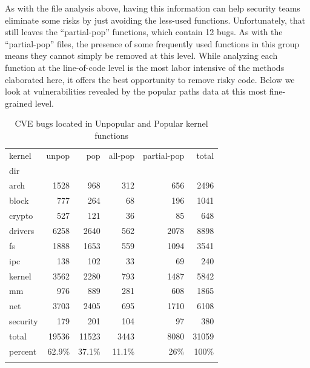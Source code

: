 As with the file analysis above, having this information can help security teams eliminate some risks by just avoiding the less-used functions. 
Unfortunately, that still leaves the ``partial-pop'' functions, which  contain 12 bugs.  As with the ``partial-pop'' files, 
the presence of some frequently used functions in this group means they cannot  simply be removed at this level. 
While analyzing each function at the line-of-code level is the most labor intensive of the methods elaborated here, it offers the best opportunity to remove risky code. 
Below we look at vulnerabilities revealed by the popular paths data at this most fine-grained level. 

\begin{table}
\small
\caption{CVE bugs located in Unpopular and Popular kernel functions}
\label{tab:cve_functions}
\begin{tabular}{l|r|r|r|r|r}
 kernel & unpop & pop & all-pop & partial-pop & total \\
 dir & \color{red}{(CVEs)} & \color{red}{(CVEs)} & \color{red}{(CVEs)} & \color{red}{(CVEs)} & \\
 \hline
 arch & 1528\color{red}{(7)} & 968\color{red}{(1)} & 312 & 656\color{red}{(1)} & 2496 \\
 \hline
 block & 777 & 264 & 68 & 196 & 1041 \\
 \hline
 crypto & 527\color{red}{(6)} & 121 & 36 & 85 & 648 \\
 \hline
 drivers & 6258\color{red}{(20)} & 2640 & 562 & 2078 & 8898 \\
 \hline
 fs & 1888\color{red}{(13)} & 1653\color{red}{(3)} & 559 & 1094\color{red}{(3)} & 3541 \\
 \hline
 ipc & 138 & 102 & 33 & 69 & 240 \\
 \hline
 kernel & 3562\color{red}{(8)} & 2280 & 793 & 1487 & 5842 \\
 \hline
 mm & 976\color{red}{(2)} & 889\color{red}{(6)} & 281 & 608\color{red}{(6)} & 1865 \\
 \hline
 net & 3703\color{red}{(9)} & 2405\color{red}{(3)} & 695\color{red}{(1)} & 1710\color{red}{(2)} & 6108 \\
 \hline
 security & 179 & 201 & 104 & 97 & 380 \\
 \hline
 total & 19536\color{red}{(65)} & 11523\color{red}{(13)} & 3443\color{red}{(1)} & 8080\color{red}{(12)} & 31059 \\
 \hline 
 percent & 62.9\% & 37.1\% & 11.1\% & 26\% & 100\% \\
 & \color{red}{(83.3\%)} & \color{red}{(16.7\%)} & \color{red}{(1.3\%)} & \color{red}{(15.4\%)} &
\end{tabular}
\end{table}

